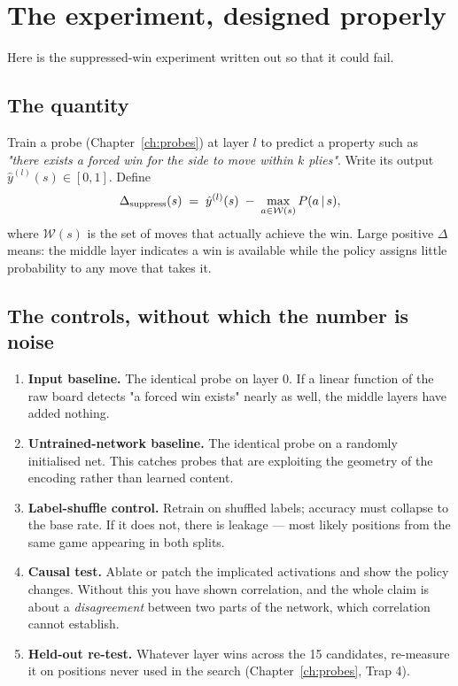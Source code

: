 \section{The experiment, designed properly}

Here is the suppressed-win experiment written out so that it could fail.

\subsection{The quantity}

Train a probe (Chapter~\ref{ch:probes}) at layer $l$ to predict a property such as
\emph{"there exists a forced win for the side to move within $k$ plies"}. Write its output
$\hat{y}^{(l)}(s) \in [0,1]$. Define
\begin{equation}
  \label{eq:suppression}
  \Delta_{\text{suppress}}(s) \;=\; \hat{y}^{(l)}(s) \;-\; \max_{a \in \mathcal{W}(s)} P(a\,|\, s),
\end{equation}
where $\mathcal{W}(s)$ is the set of moves that actually achieve the win. Large positive
$\Delta$ means: the middle layer indicates a win is available while the policy assigns little
probability to any move that takes it.

\subsection{The controls, without which the number is noise}

\begin{enumerate}
\item \textbf{Input baseline.} The identical probe on layer 0. If a linear function of the
  raw board detects "a forced win exists" nearly as well, the middle layers have added nothing.
\item \textbf{Untrained-network baseline.} The identical probe on a randomly initialised net.
  This catches probes that are exploiting the geometry of the encoding rather than learned
  content.
\item \textbf{Label-shuffle control.} Retrain on shuffled labels; accuracy must collapse to the
  base rate. If it does not, there is leakage --- most likely positions from the same game
  appearing in both splits.
\item \textbf{Causal test.} Ablate or patch the implicated activations and show the policy
  changes. Without this you have shown correlation, and the whole claim is about a
  \emph{disagreement} between two parts of the network, which correlation cannot establish.
\item \textbf{Held-out re-test.} Whatever layer wins across the 15 candidates, re-measure it on
  positions never used in the search (Chapter~\ref{ch:probes}, Trap 4).
\end{enumerate}

